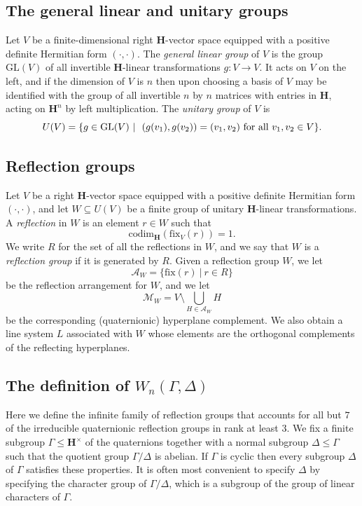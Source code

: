 \documentclass[11pt, reqno]{amsart}
\numberwithin{equation}{section}
\theoremstyle{definition}
\theoremstyle{plain}
\newcommand{\HH}{\mathbf{H}}
\begin{document}
\subsection{The general linear and unitary groups} Let $V$ be a finite-dimensional right $\HH$-vector space equipped with a positive definite Hermitian form $(\cdot,\cdot)$. The \emph{general linear group} of $V$ is the group $\mathrm{GL}(V)$ of all invertible $\HH$-linear transformations $g:V \to V$. It acts on $V$ on the left, and if the dimension of $V$ is $n$ then upon choosing a basis of $V$ may be identified with the group of all invertible $n$ by $n$ matrices with entries in $\HH$, acting on $\HH^n$ by left multiplication.  The \emph{unitary group} of $V$ is 
$$U(V)=\{g \in \mathrm{GL}(V) \ | \ (g(v_1),g(v_2))=(v_1,v_2) \ \hbox{for all $v_1,v_2 \in V$} \}.$$

\subsection{Reflection groups} Let $V$ be a right $\HH$-vector space equipped with a positive definite Hermitian form $(\cdot,\cdot)$, and let $W \subseteq U(V)$ be a finite group of unitary $\HH$-linear transformations. A \emph{reflection} in $W$ is an element $r \in W$ such that
$$\mathrm{codim}_\HH(\mathrm{fix}_V(r))=1.$$ We write $R$ for the set of all the reflections in $W$, and we say that $W$ is a \emph{reflection group} if it is generated by $R$. Given a reflection group $W$, we let
$$\mathcal{A}_W=\{ \mathrm{fix}(r) \ | \ r \in R\}$$ be the reflection arrangement for $W$, and we let
$$\mathcal{M}_W=V \setminus \bigcup_{H \in \mathcal{A}_W} H$$ be the corresponding (quaternionic) hyperplane complement. We also obtain a line system $L$ associated with $W$ whose elements are the orthogonal complements of the reflecting hyperplanes.

\subsection{The definition of $W_n(\Gamma,\Delta)$} \label{infinite family} Here we define the infinite family of reflection groups that accounts for all but $7$ of the irreducible quaternionic reflection groups in rank at least $3$. We fix a finite subgroup $\Gamma \leq \HH^\times$ of the quaternions together with a normal subgroup $\Delta \leq \Gamma$ such that the quotient group $\Gamma/\Delta$ is abelian. If $\Gamma$ is cyclic then every subgroup $\Delta$ of $\Gamma$ satisfies these properties. It is often most convenient to specify $\Delta$ by specifying the character group of $\Gamma/\Delta$, which is a subgroup of the group of linear characters of $\Gamma$. 
\end{document}
